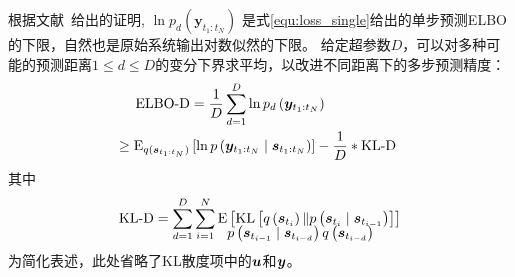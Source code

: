 根据文献~\cite{Hafner2019}给出的证明, $\ln p_d\left(\boldsymbol{y}_{t_{1}: t_{N}}\right)$ 是式\eqref{equ:loss_single}给出的单步预测ELBO的下限，自然也是原始系统输出对数似然的下限。
给定超参数$D$，可以对多种可能的预测距离$1\leq d \leq D$的变分下界求平均，以改进不同距离下的多步预测精度：
\begin{equation}
\begin{aligned}
    \text{ELBO-D}&=\frac{1}{D}\sum_{d=1}^{D}\ln p_d\left(\boldsymbol{y}_{t_{1}: t_{N}}\right) \\
     \geq\mathrm{E}_{q(\boldsymbol s_{t_1:t_N})}&\left[\ln p\left(\boldsymbol y_{t_1:t_N} \mid \boldsymbol s_{t_1:t_N}\right)\right]-\frac{1}{D}*\text{KL-D}\
\end{aligned}
\end{equation}
其中
\begin{equation}
\begin{aligned}
\text{KL-D}=\sum_{d=1}^{D}\sum_{i=1}^{N}\mathrm{E}&\left[\operatorname{KL}\left[q\left(\boldsymbol{s}_{t_{i}} \right) \| p\left(\boldsymbol{s}_{t_{i}} \mid \boldsymbol{s}_{t_{i-1}}\right)\right]\right]\\[-15pt]
&{\small{p\left(\boldsymbol{s}_{t_{i-1}} \mid \boldsymbol{s}_{t_{i-d}}\right){q\left(\boldsymbol{s}_{t_{i-d}} \right)}}}
\end{aligned}
\label{equ:kld}
\end{equation}
为简化表述，此处省略了KL散度项中的$\boldsymbol u$和$\boldsymbol y$。

